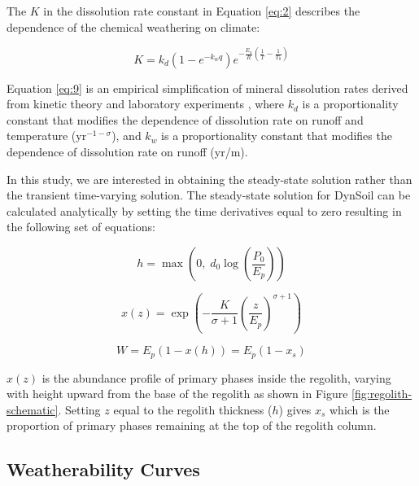 The $K$ in the dissolution rate constant in Equation \ref{eq:2} describes the dependence of the chemical weathering on climate:

\begin{equation}
    K = k_{d}\left(1-e^{-k_{w}q}\right)e^{-\frac{E_{a}}{R}\left(\frac{1}{T}-\frac{1}{T_{0}}\right)}
    \label{eq:9}
\end{equation}

\noindent
Equation \ref{eq:9} is an empirical simplification of mineral dissolution rates derived from kinetic theory and laboratory experiments \citep{West2012a}, where $k_{d}$ is a proportionality constant that modifies the dependence of dissolution rate on runoff and temperature (yr$^{-1-\sigma}$), and $k_{w}$ is a proportionality constant that modifies the dependence of dissolution rate on runoff (yr/m).

In this study, we are interested in obtaining the steady-state solution rather than the transient time-varying solution. The steady-state solution for DynSoil can be calculated analytically by setting the time derivatives equal to zero resulting in the following set of equations:

\begin{equation}
    h = \max\left(0,\;d_{0} \log\left(\frac{P_{0}}{E_{p}}\right)\right)
    \label{eq:10}
\end{equation}

\begin{equation}
    x(z) = \exp\left(-\frac{K}{\sigma+1}\left(\frac{z}{E_{p}}\right)^{\sigma+1}\right)
    \label{eq:11}
\end{equation}

\begin{equation}
    W = E_{p}(1-x(h)) = E_{p}(1-x_s)
    \label{eq:12}
\end{equation}

\noindent
$x(z)$ is the abundance profile of primary phases inside the regolith, varying with height upward from the base of the regolith as shown in Figure \ref{fig:regolith-schematic}. Setting $z$ equal to the regolith thickness ($h$) gives $x_s$ which is the proportion of primary phases remaining at the top of the regolith column.

\subsection{Weatherability Curves}

